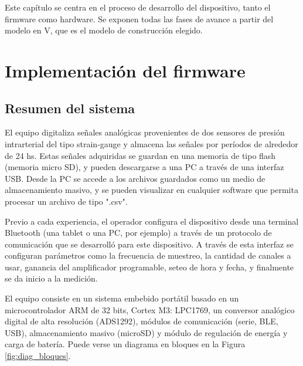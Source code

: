 


Este capítulo se centra en el proceso de desarrollo del dispositivo, tanto el firmware como hardware. Se exponen todas las fases de avance a partir del  modelo en V, que  es el modelo de construcción elegido.


\section{Implementación del firmware}

\subsection{Resumen del sistema}

El equipo digitaliza señales analógicas provenientes de dos sensores de presión intrarterial del tipo strain-gauge y almacena las señales por períodos de alrededor de 24 hs. Estas señales adquiridas se guardan en una memoria de tipo flash (memoria micro SD), y pueden descargarse a una PC a través de una interfaz USB. Desde la PC se accede a los archivos guardados como un medio de almacenamiento masivo, y se pueden visualizar en cualquier software que permita procesar un archivo de tipo ".csv".

Previo a cada experiencia, el operador configura el dispositivo desde una terminal Bluetooth (una tablet o una PC, por ejemplo) a través de un protocolo de comunicación que se desarrolló para este dispositivo. A través de esta interfaz se configuran parámetros como la frecuencia de muestreo, la cantidad de canales a usar, ganancia del amplificador programable, seteo de hora y fecha, y finalmente se da inicio a la medición. 

El equipo consiste en un sistema embebido portátil basado en un microcontrolador ARM de 32 bits, Cortex M3: LPC1769, un conversor analógico digital de alta resolución (ADS1292), módulos de comunicación (serie, BLE, USB), almacenamiento masivo (microSD) y módulo de regulación de energía y carga de batería. Puede verse un diagrama en bloques en la Figura \ref{fig:diag_bloques}. 


